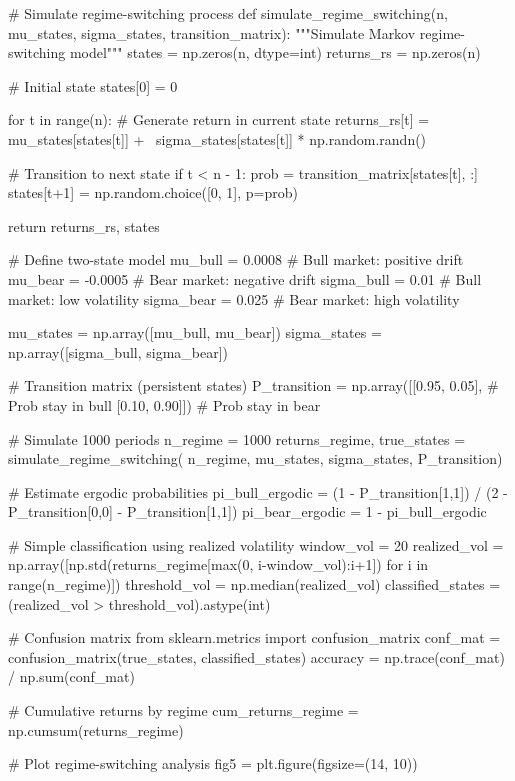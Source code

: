 \documentclass[a4paper, 11pt]{article}
\begin{document}
\begin{pycode}
# Simulate regime-switching process
def simulate_regime_switching(n, mu_states, sigma_states, transition_matrix):
    """Simulate Markov regime-switching model"""
    states = np.zeros(n, dtype=int)
    returns_rs = np.zeros(n)

    # Initial state
    states[0] = 0

    for t in range(n):
        # Generate return in current state
        returns_rs[t] = mu_states[states[t]] + \
                        sigma_states[states[t]] * np.random.randn()

        # Transition to next state
        if t < n - 1:
            prob = transition_matrix[states[t], :]
            states[t+1] = np.random.choice([0, 1], p=prob)

    return returns_rs, states

# Define two-state model
mu_bull = 0.0008  # Bull market: positive drift
mu_bear = -0.0005  # Bear market: negative drift
sigma_bull = 0.01  # Bull market: low volatility
sigma_bear = 0.025  # Bear market: high volatility

mu_states = np.array([mu_bull, mu_bear])
sigma_states = np.array([sigma_bull, sigma_bear])

# Transition matrix (persistent states)
P_transition = np.array([[0.95, 0.05],   # Prob stay in bull
                         [0.10, 0.90]])  # Prob stay in bear

# Simulate 1000 periods
n_regime = 1000
returns_regime, true_states = simulate_regime_switching(
    n_regime, mu_states, sigma_states, P_transition)

# Estimate ergodic probabilities
pi_bull_ergodic = (1 - P_transition[1,1]) / (2 - P_transition[0,0] - P_transition[1,1])
pi_bear_ergodic = 1 - pi_bull_ergodic

# Simple classification using realized volatility
window_vol = 20
realized_vol = np.array([np.std(returns_regime[max(0, i-window_vol):i+1])
                         for i in range(n_regime)])
threshold_vol = np.median(realized_vol)
classified_states = (realized_vol > threshold_vol).astype(int)

# Confusion matrix
from sklearn.metrics import confusion_matrix
conf_mat = confusion_matrix(true_states, classified_states)
accuracy = np.trace(conf_mat) / np.sum(conf_mat)

# Cumulative returns by regime
cum_returns_regime = np.cumsum(returns_regime)

# Plot regime-switching analysis
fig5 = plt.figure(figsize=(14, 10))


\end{pycode}
\end{document}
